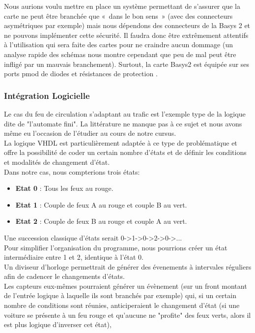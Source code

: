 			Nous aurions voulu mettre en place un système permettant de s’assurer que la carte ne peut être branchée que « dans le bon sens » (avec des connecteurs asymétriques par exemple) mais nous dépendons des connecteurs de la Basys 2 et ne pouvons implémenter cette sécurité. Il faudra donc être extrêmement attentifs à l’utilisation qui sera faite des cartes pour ne craindre aucun dommage (un analyse rapide des schémas nous montre cependant que peu de mal peut être infligé par un mauvais branchement). Surtout, la carte Basys2 est équipée sur ses ports pmod de diodes et résistances de protection \cite{bib23}.

	\subsubsection{Intégration Logicielle}

		Le cas du feu de circulation s'adaptant au trafic est l'exemple type de la logique dite de "l'automate fini". La littérature ne manque pas à ce sujet et nous avons même eu l'occasion de l'étudier au cours de notre cursus.\\

		La logique VHDL  est particulièrement adaptée à ce type de problématique et offre la possibilité de coder un certain nombre d'états et de définir les conditions et modalités de changement d'état.\\

		Dans notre cas, nous compterions trois états:
		\begin{itemize}
			\item \textbf{Etat 0} : Tous les feux au rouge.
			\item \textbf{Etat 1} : Couple de feux A au rouge et couple B au vert.
			\item \textbf{Etat 2} : Couple de feux B au rouge et couple A au vert.
		\end{itemize}

		\vspace {12pt}
		Une succession classique d'états serait 0->1->0->2->0->...\\
		Pour simplifier l'organisation du programme, nous pourrions créer un état intermédiaire entre 1 et 2, identique à l'état 0.\\

		Un diviseur d'horloge permettrait de générer des évenements à intervales réguliers afin de cadencer le changements d'états.\\
		Les capteurs eux-mêmes pourraient générer un évènement (sur un front montant de l'entrée logique à laquelle ils sont branchés par exemple) qui, si un certain nombre de conditions sont réunies, anticiperaient le changement d'état (si une voiture se présente à un feu rouge et qu'aucune ne "profite" des feux verts, alors il est plus logique d'inverser cet état),


